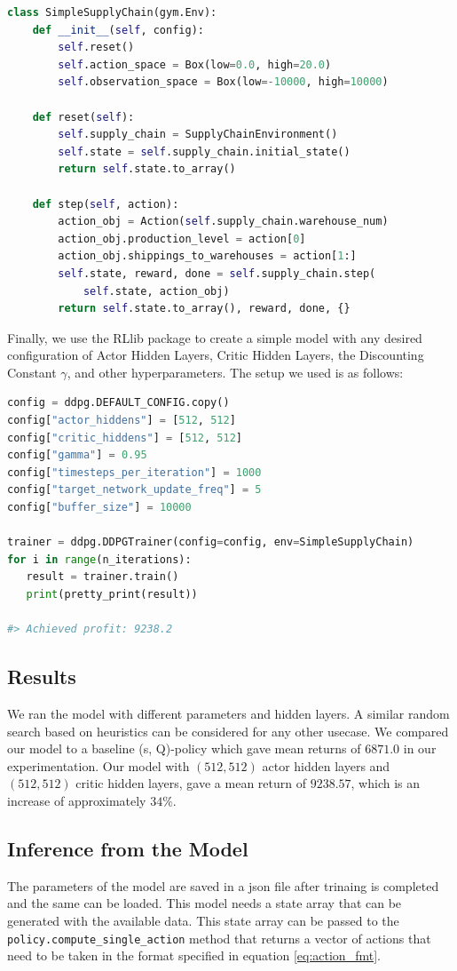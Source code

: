 \documentclass{article}
\begin{document}
\begin{lstlisting}[language=Python]
class SimpleSupplyChain(gym.Env):
    def __init__(self, config):
        self.reset()
        self.action_space = Box(low=0.0, high=20.0)
        self.observation_space = Box(low=-10000, high=10000)

    def reset(self):
        self.supply_chain = SupplyChainEnvironment()
        self.state = self.supply_chain.initial_state()
        return self.state.to_array()

    def step(self, action):
        action_obj = Action(self.supply_chain.warehouse_num)
        action_obj.production_level = action[0]
        action_obj.shippings_to_warehouses = action[1:]
        self.state, reward, done = self.supply_chain.step(
            self.state, action_obj)
        return self.state.to_array(), reward, done, {}
\end{lstlisting}

Finally, we use the RLlib package to create a simple model with any desired configuration of Actor Hidden Layers, Critic Hidden Layers, the Discounting Constant \( \gamma \), and other hyperparameters. The setup we used is as follows:

\begin{lstlisting}[language=Python]
config = ddpg.DEFAULT_CONFIG.copy()
config["actor_hiddens"] = [512, 512] 
config["critic_hiddens"] = [512, 512]
config["gamma"] = 0.95
config["timesteps_per_iteration"] = 1000
config["target_network_update_freq"] = 5
config["buffer_size"] = 10000
    
trainer = ddpg.DDPGTrainer(config=config, env=SimpleSupplyChain)
for i in range(n_iterations):
   result = trainer.train()
   print(pretty_print(result))
  
#> Achieved profit: 9238.2
\end{lstlisting}

\subsection{Results}
We ran the model with different parameters and hidden layers. A similar random search based on heuristics can be considered for any other usecase. We compared our model to a baseline (s, Q)-policy which gave mean returns of $6871.0$ in our experimentation. Our model with $(512, 512)$ actor hidden layers and $(512, 512)$ critic hidden layers, gave a mean return of $9238.57$, which is an increase of approximately $34 \%$.


\subsection{Inference from the Model}
The parameters of the model are saved in a json file after trinaing is completed and the same can be loaded. This model needs a state array that can be generated with the available data. This state array can be passed to the \lstinline{policy.compute_single_action} method that returns a vector of actions that need to be taken in the format specified in equation \eqref{eq:action_fmt}. 
\end{document}
